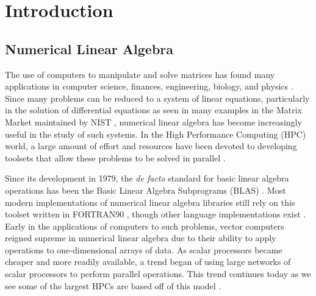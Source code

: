 \documentclass{dependencies/acm_proc_article-sp}
\begin{document}
%

%

\section{Introduction}
\subsection{Numerical Linear Algebra}

The use of computers to manipulate and solve matrices has found many applications in computer science, finances, engineering, biology, and physics \cite{TrefethenNLA}. Since many problems can be reduced to a system of linear equations, particularly in the solution of differential equations as seen in many examples in the Matrix Market maintained by NIST \cite{MatrixMarket}, numerical linear algebra has become increasingly useful in the study of such systems. In the High Performance Computing (HPC) world, a large amount of effort and resources have been devoted to developing toolsets that allow these problems to be solved in parallel \cite{SCALAPACK,LAPACK,PLASMA,PSBLAS}.

Since its development in 1979, the {\em de facto} standard for basic linear algebra operations has been the Basic Linear Algebra Subprograms (BLAS) \cite{BLAS}. Most modern implementations of numerical linear algebra libraries still rely on this toolset written in FORTRAN90 \cite{LAPACK}, though other language implementations exist \cite{CLAPACK,JBLAS}. Early in the applications of computers to such problems, vector computers reigned supreme in numerical linear algebra due to their ability to apply operations to one-dimensional arrays of data. As scalar processors became cheaper and more readily available, a trend began of using large networks of scalar processors to perform parallel operations. This trend continues today as we see some of the largest HPCs are based off of this model \cite{Jaguar}.
\end{document}
